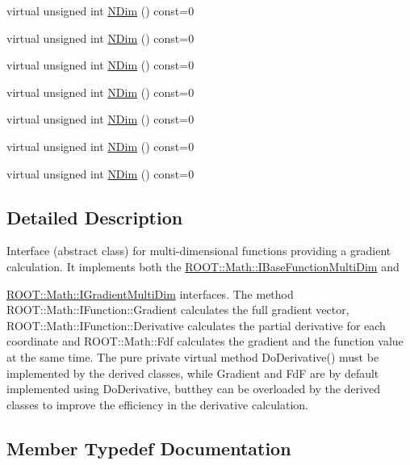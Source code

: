 \begin{DoxyCompactItemize}
virtual unsigned int \mbox{\hyperlink{classROOT_1_1Math_1_1IGradientFunctionMultiDim_af046a6f630930e59fe5356a9795aec46}{N\+Dim}} () const=0
\item 
virtual unsigned int \mbox{\hyperlink{classROOT_1_1Math_1_1IGradientFunctionMultiDim_af046a6f630930e59fe5356a9795aec46}{N\+Dim}} () const=0
\item 
virtual unsigned int \mbox{\hyperlink{classROOT_1_1Math_1_1IGradientFunctionMultiDim_af046a6f630930e59fe5356a9795aec46}{N\+Dim}} () const=0
\item 
virtual unsigned int \mbox{\hyperlink{classROOT_1_1Math_1_1IGradientFunctionMultiDim_af046a6f630930e59fe5356a9795aec46}{N\+Dim}} () const=0
\item 
virtual unsigned int \mbox{\hyperlink{classROOT_1_1Math_1_1IGradientFunctionMultiDim_af046a6f630930e59fe5356a9795aec46}{N\+Dim}} () const=0
\item 
virtual unsigned int \mbox{\hyperlink{classROOT_1_1Math_1_1IGradientFunctionMultiDim_af046a6f630930e59fe5356a9795aec46}{N\+Dim}} () const=0
\item 
virtual unsigned int \mbox{\hyperlink{classROOT_1_1Math_1_1IGradientFunctionMultiDim_af046a6f630930e59fe5356a9795aec46}{N\+Dim}} () const=0
\end{DoxyCompactItemize}


\subsection{Detailed Description}
Interface (abstract class) for multi-\/dimensional functions providing a gradient calculation. It implements both the \mbox{\hyperlink{classROOT_1_1Math_1_1IBaseFunctionMultiDim}{R\+O\+O\+T\+::\+Math\+::\+I\+Base\+Function\+Multi\+Dim}} and

\mbox{\hyperlink{classROOT_1_1Math_1_1IGradientMultiDim}{R\+O\+O\+T\+::\+Math\+::\+I\+Gradient\+Multi\+Dim}} interfaces. The method R\+O\+O\+T\+::\+Math\+::\+I\+Function\+::\+Gradient calculates the full gradient vector, R\+O\+O\+T\+::\+Math\+::\+I\+Function\+::\+Derivative calculates the partial derivative for each coordinate and R\+O\+O\+T\+::\+Math\+::\+Fdf calculates the gradient and the function value at the same time. The pure private virtual method Do\+Derivative() must be implemented by the derived classes, while Gradient and FdF are by default implemented using Do\+Derivative, butthey can be overloaded by the derived classes to improve the efficiency in the derivative calculation. 

\subsection{Member Typedef Documentation}
\mbox{\label{classROOT_1_1Math_1_1IGradientFunctionMultiDim_a803074495bafb5acf9f130b648001609}} 
